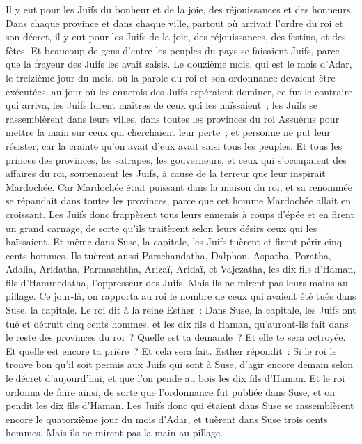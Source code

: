 \begin{multicols}{2}
Il y eut pour les Juifs du bonheur et de la joie, des réjouissances et des honneurs.
Dans chaque province et dans chaque ville, partout où arrivait l'ordre du roi et son décret, il y eut pour les Juifs de la joie, des réjouissances, des festins, et des fêtes. Et beaucoup de gens d'entre les peuples du pays se faisaient Juifs, parce que la frayeur des Juifs les avait saisis.
\VerseOne{}Le douzième mois, qui est le mois d'Adar, le treizième jour du mois, où la parole du roi et son ordonnance devaient être exécutées, au jour où les ennemis des Juifs espéraient dominer, ce fut le contraire qui arriva, les Juifs furent maîtres de ceux qui les haïssaient~; 
les Juifs se rassemblèrent dans leurs villes, dans toutes les provinces du roi Assuérus pour mettre la main sur ceux qui cherchaient leur perte~; et personne ne put leur résister, car la crainte qu'on avait d'eux avait saisi tous les peuples.
Et tous les princes des provinces, les satrapes, les gouverneurs, et ceux qui s'occupaient des affaires du roi, soutenaient les Juifs, à cause de la terreur que leur inspirait Mardochée.
Car Mardochée était puissant dans la maison du roi, et sa renommée se répandait dans toutes les provinces, parce que cet homme Mardochée allait en croissant.
Les Juifs donc frappèrent tous leurs ennemis à coups d'épée et en firent un grand carnage, de sorte qu'ils traitèrent selon leurs désirs ceux qui les haïssaient.
Et même dans Suse, la capitale, les Juifs tuèrent et firent périr cinq cents hommes.
Ils tuèrent aussi Parschandatha, Dalphon, Aspatha,
Poratha, Adalia, Aridatha,
Parmaschtha, Arizaï, Aridaï, et Vajezatha,
les dix fils d'Haman, fils d'Hammedatha, l'oppresseur des Juifs. Mais ils ne mirent pas leurs mains au pillage.
Ce jour-là, on rapporta au roi le nombre de ceux qui avaient été tués dans Suse, la capitale.
Le roi dit à la reine Esther~: Dans Suse, la capitale, les Juifs ont tué et détruit cinq cents hommes, et les dix fils d'Haman, qu'auront-ils fait dans le reste des provinces du roi~? Quelle est ta demande~? Et elle te sera octroyée. Et quelle est encore ta prière~? Et cela sera fait.
Esther répondit~: Si le roi le trouve bon qu'il soit permis aux Juifs qui sont à Suse, d'agir encore demain selon le décret d'aujourd'hui, et que l'on pende au bois les dix fils d'Haman.
Et le roi ordonna de faire ainsi, de sorte que l'ordonnance fut publiée dans Suse, et on pendit les dix fils d'Haman.
Les Juifs donc qui étaient dans Suse se rassemblèrent encore le quatorzième jour du mois d'Adar, et tuèrent dans Suse trois cents hommes. Mais ils ne mirent pas la main au pillage.

\end{multicols}
